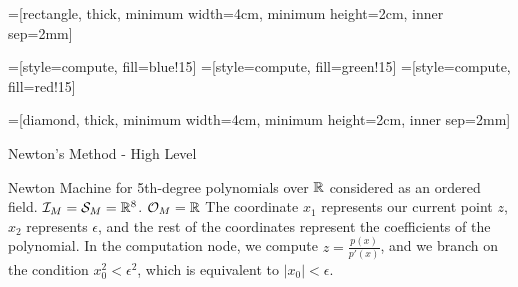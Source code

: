 \documentclass{article}
\begin{document}
=[rectangle, 
                     thick, 
                     minimum width=4cm, 
                     minimum height=2cm, 
                     inner sep=2mm]

=[style=compute, 
                   fill=blue!15]
=[style=compute, 
                   fill=green!15]
=[style=compute, 
                    fill=red!15]

=[diamond, 
                    thick, 
                    minimum width=4cm, 
                    minimum height=2cm, 
                    inner sep=2mm]


{\Huge Newton's Method - High Level}\\


\newpage


Newton Machine for 5th-degree polynomials over $\mathbb{R}$ considered as
an ordered field.  $\mathcal{I}_M = \mathcal{S}_M = \mathbb{R}^8$.
$\mathcal{O}_M = \mathbb{R}$ The coordinate $x_1$ represents our current
point $z$, $x_2$ represents $\epsilon$, and the rest of the
coordinates represent the coefficients of the polynomial. In the
computation node, we compute $z = \frac{p(x)}{p'(x)}$, and we branch
on the condition $x_0^2 < \epsilon^2$, which is equivalent to $|x_0| <
\epsilon$.
\end{document}
